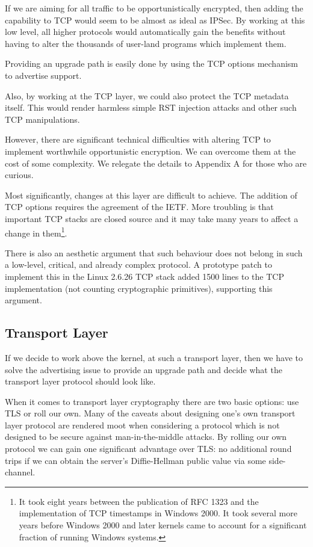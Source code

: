 \documentclass[conference]{IEEEtran}
\begin{document}
If we are aiming for all traffic to be opportunistically encrypted, then adding
the capability to TCP would seem to be almost as ideal as IPSec. By working at
this low level, all higher protocols would automatically gain the benefits
without having to alter the thousands of user-land programs which implement
them.

Providing an upgrade path is easily done by using the TCP options mechanism to
advertise support.

Also, by working at the TCP layer, we could also protect the TCP metadata
itself. This would render harmless simple RST injection attacks\cite{comcast}
and other such TCP manipulations.

However, there are significant technical difficulties with altering TCP to
implement worthwhile opportunistic encryption. We can overcome them at the cost
of some complexity. We relegate the details to Appendix A for those who are
curious.

Most significantly, changes at this layer are difficult to achieve. The
addition of TCP options requires the agreement of the IETF.
More troubling is that important TCP stacks are closed source and it may take
many years to affect a change in them\footnote{It took eight years between the
publication of RFC 1323 and the implementation of TCP timestamps in Windows
2000. It took several more years before Windows 2000 and later kernels came to
account for a significant fraction of running Windows systems.}.

There is also an aesthetic argument that such behaviour does not belong in such
a low-level, critical, and already complex protocol. A prototype patch to
implement this in the Linux 2.6.26 TCP stack added 1500 lines to the TCP
implementation (not counting cryptographic primitives), supporting this
argument.

\subsection{Transport Layer}

If we decide to work above the kernel, at such a transport layer, then we have to
solve the advertising issue to provide an upgrade path and decide what the
transport layer protocol should look like.

When it comes to transport layer cryptography there are two basic options: use
TLS or roll our own. Many of the caveats about designing one's own transport
layer protocol are rendered moot when considering a protocol which is not
designed to be secure against man-in-the-middle attacks. By rolling our own
protocol we can gain one significant advantage over TLS: no additional round
trips if we can obtain the server's Diffie-Hellman public value via some
side-channel.
\end{document}
